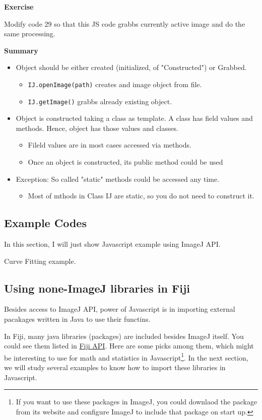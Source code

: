 \documentclass[11pt,a4paper,oneside]{report}
\newenvironment{indentexercise}[1]%
{{\setlength{\leftmargin}{2em}}%
\textbf{Exercise \thesubsection-#1}%
\begin{list}{}%
	\item%
}
{\end{list}}
\newcommand{\ilcom}[1]{\texttt{\small#1}}
\begin{document}
\begin{indentexercise}{1}
Modify code 29 so that this JS code grabbs currently active image and do the same processing. 
\end{indentexercise}

\textbf{Summary}
\begin{itemize}
\item Object should be either created (initialized, of "Constructed") or Grabbed. 
\begin{itemize}
\item \ilcom{IJ.openImage(path)} creates and image object from file.
\item \ilcom{IJ.getImage()} grabbs already existing object. 
\end{itemize}
\item Object is constructed taking a class as template. A class has field values and methods. Hence, object has those values and classes. 
\begin{itemize}
\item Fileld values are in most cases accessed via methods.
\item Once an object is constructed, its public method could be used
\end{itemize}
\item Exception: So called "static" methods could be accessed any time. 
\begin{itemize}
\item Most of mthods in Class IJ are static, so you do not need to construct it.
\end{itemize}
\end{itemize}

\subsection{Example Codes}

In this section, I will just show Javascript example using ImageJ API. 

Curve Fitting example. 



\subsection{Using none-ImageJ libraries in Fiji}

Besides access to ImageJ API, power of Javascript is in importing external pacakages written in Java to use their functins.

In Fiji, many java libraries (packages) are included besides ImageJ itself. You could see them listed in \href{http://pacific.mpi-cbg.de/javadoc/}{Fiji API}. Here are some picks among them, which might be interesting to use for math and statistics in Javascript\footnote{ If you want to use these packages in ImageJ, you could downlaod the package from its website and configure ImageJ to include that package on start up.}. In the next section, we will study several examples to know how to import these libraries in Javascript. 
\end{document}
